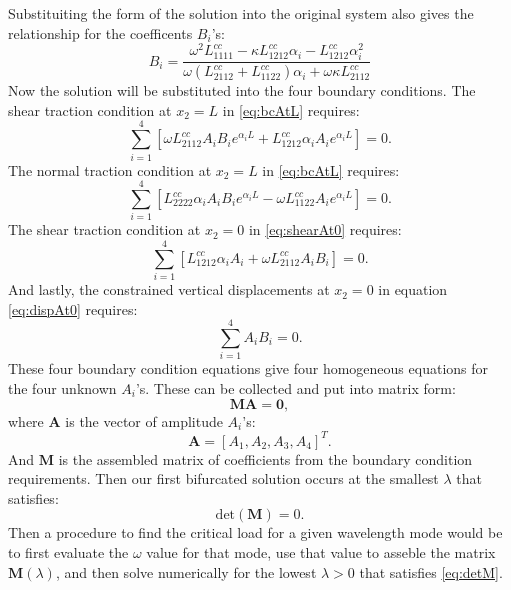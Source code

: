 \documentclass[11pt]{article}
\begin{document}
Substituiting the form of the solution into the original system also gives the relationship for the coefficents $B_i$'s:
\begin{equation}
B_i = \frac {\omega^2 L^{cc}_{1111} - \kappa L^{cc}_{1212} \alpha_i - L^{cc}_{1212} \alpha_i^2 }
            {\omega \left (L^{cc}_{2112} + L^{cc}_{1122} \right) \alpha_i + \omega \kappa L^{cc}_{2112}}
\end{equation}
Now the solution will be substituted into the four boundary conditions. The shear traction condition at $x_2 = L$ in \eqref{eq:bcAtL}  requires:
\begin{equation}
\sum_{i = 1}^4 \left[ \omega L^{cc}_{2112} A_iB_i e^{\alpha_iL} + L^{cc}_{1212} \alpha_i A_i e^{\alpha_i L} \right ] = 0.
\end{equation}
The normal traction condition at $x_2 = L$ in \eqref{eq:bcAtL}  requires:
\begin{equation}
\sum_{i = 1}^4 \left [ L^{cc}_{2222} \alpha_i A_i B_i e^{\alpha_i L} - \omega L^{cc}_{1122} A_i e^{\alpha_i L} \right ] = 0 .
\end{equation}
The shear traction condition at $x_2 = 0$ in \eqref{eq:shearAt0} requires:
\begin{equation}
\sum_{i = 1}^4 \left [ L^{cc}_{1212} \alpha_iA_i + \omega L^{cc}_{2112} A_i B_i \right ] = 0.
\end{equation}
And lastly, the constrained vertical displacements at $x_2 = 0$ in equation \eqref{eq:dispAt0} requires:
\begin{equation}
\sum_{i=1}^4 A_i B_i = 0.
\end{equation}
These four boundary condition equations give four homogeneous equations for the four unknown $A_i$'s. These can be collected and put into matrix form:
\begin{equation}
\mathbf{M} \mathbf{A} = \mathbf{0},
\end{equation}
where $\mathbf{A}$ is the vector of amplitude $A_i$'s:
\begin{equation}
\mathbf{A} = [ A_1, A_2, A_3, A_4 ]^T.
\end{equation}
And $\mathbf{M}$ is the assembled matrix of coefficients from the boundary condition requirements. Then our first bifurcated solution occurs at the smallest $\lambda$ that satisfies:
\begin{equation} \label{eq:detM}
\mathrm{det}(\mathbf{M}) = 0.
\end{equation}
Then a procedure to find the critical load for a given wavelength mode would be to first evaluate the $\omega$ value for that mode, use that value to asseble the matrix $\mathbf{M}(\lambda)$, and then solve numerically for the lowest $\lambda > 0$ that satisfies \eqref{eq:detM}.
\end{document}
